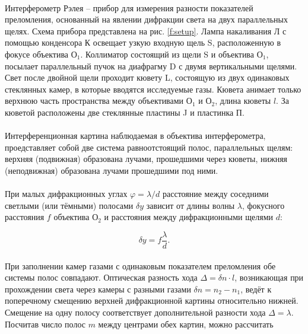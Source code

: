 \documentclass[a4paper,12pt]{article} %
\begin{document}
\paragraph{} Интерферометр Рэлея -- прибор для измерения разности показателей преломления, основанный на явлении дифракции света на двух параллельных щелях. Схема прибора представлена на рис. \ref{f:setup}. Лампа накаливания Л с помощью конденсора К освещает узкую входную щель S, расположенную в фокусе объектива О$_1$. Коллиматор состоящий из щели S и объектива О$_1$, посылает параллельный пучок на диафрагму D с двумя вертикальными щелями. Свет после двойной щели проходит кювету L, состоящую из двух одинаковых стеклянных камер, в которые вводятся исследуемые газы. Кювета анимает только верхнюю часть пространства между объективами О$_1$ и О$_2$, длина кюветы $l$. За кюветой расположены две стеклянные пластины J и пластинка П.

\paragraph{} Интерференционная картина наблюдаемая в объектива интерферометра, проедставляет собой две система равноотстоящий полос, параллельных щелям: верхняя (подвижная) образована лучами, прошедшими через кюветы, нижняя (неподвижная) образована лучами прошедшими под ними.

\paragraph{} При малых дифракционных углах $\varphi = \lambda/d$ расстояние между соседними светлыми (или тёмными) полосами $\delta y$ зависит от длины волны $\lambda$, фокусного расстояния $f$ объектива О$_2$ и расстояния между дифракционными щелями $d$:

\begin{equation}
\delta y = f \frac{\lambda}{d}.
\label{e:difr}
\end{equation}

\paragraph{} При заполнении камер газами с одинаковым показателем преломления обе системы полос совпадают. Оптическая разность хода $\Delta = \delta n \cdot l$, возникающая при прохождении света через камеры с разными газами $\delta n = n_2 - n_1$, ведёт к поперечному смещению верхней дифракционной картины относительно нижней. Смещение на одну полосу соответствует дополнительной разности хода $\Delta = \lambda$. Посчитав число полос $m$ между центрами обех картин, можно рассчитать
\end{document}
